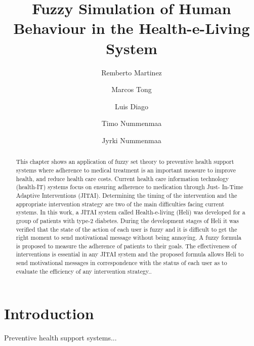 \documentclass{llncs}
\begin{document}
\title{Fuzzy Simulation of Human Behaviour in the Health-e-Living System}

\author{Remberto Martinez \and Marcos Tong \and Luis Diago \and Timo Nummenmaa \and Jyrki Nummenmaa }


\maketitle
%
\begin{abstract}

This chapter shows an application of fuzzy set theory to preventive health support systems where adherence to medical treatment is an important measure to improve health, and reduce health care costs. Current health care information technology (health-IT) systems focus on ensuring adherence to medication through Just- In-Time Adaptive Interventions (JITAI). Determining the timing of the intervention and the appropriate intervention strategy are two of the main difficulties facing current systems. In this work, a JITAI system called Health-e-living (Heli) was developed for a group of patients with type-2 diabetes. During the development stages of Heli it was verified that the state of the action of each user is fuzzy and it is difficult to get the right moment to send motivational message without being annoying. A fuzzy formula is proposed to measure the adherence of patients to their goals. The effectiveness of interventions is essential in any JITAI system and the proposed formula allows Heli to send motivational messages in correspondence with the status of each user as to evaluate the efficiency of any intervention strategy.. 

\end{abstract}

%

\section{Introduction}
%

Preventive health support systems...
\end{document}
